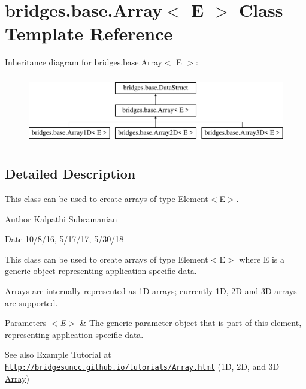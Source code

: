 \hypertarget{classbridges_1_1base_1_1_array}{}\section{bridges.\+base.\+Array$<$ E $>$ Class Template Reference}
\label{classbridges_1_1base_1_1_array}
Inheritance diagram for bridges.\+base.\+Array$<$ E $>$\+:\begin{figure}[H]
\begin{center}
\leavevmode
\includegraphics[height=3.000000cm]{classbridges_1_1base_1_1_array}
\end{center}
\end{figure}


\subsection{Detailed Description}
This class can be used to create arrays of type Element$<$\+E$>$. 

\begin{DoxyAuthor}{Author}
Kalpathi Subramanian
\end{DoxyAuthor}
\begin{DoxyDate}{Date}
10/8/16, 5/17/17, 5/30/18
\end{DoxyDate}
This class can be used to create arrays of type Element$<$\+E$>$ where E is a generic object representing application specific data.

Arrays are internally represented as 1D arrays; currently 1D, 2D and 3D arrays are supported.


\begin{DoxyParams}{Parameters}
{\em $<$\+E$>$} & The generic parameter object that is part of this element, representing application specific data.\\
\hline
\end{DoxyParams}
\begin{DoxySeeAlso}{See also}
Example Tutorial at ~\newline
 \href{http://bridgesuncc.github.io/tutorials/Array.html}{\tt http\+://bridgesuncc.\+github.\+io/tutorials/\+Array.\+html} (1D, 2D, and 3D \hyperlink{classbridges_1_1base_1_1_array}{Array})~\newline
 
\end{DoxySeeAlso}

